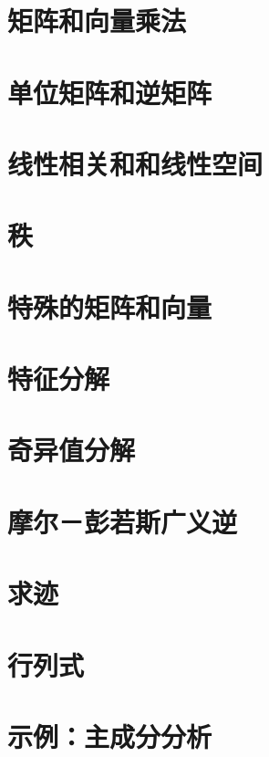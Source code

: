 \documentclass[a4paper,11pt]{book}
\begin{document}
\section{矩阵和向量乘法}
\label{sec:2.2}

\section{单位矩阵和逆矩阵}
\label{sec:2.3}

\section{线性相关和和线性空间}
\label{sec:2.4}

\section{秩}
\label{sec:2.5}

\section{特殊的矩阵和向量}
\label{sec:2.6}

\section{特征分解}
\label{sec:2.7}

\section{奇异值分解}
\label{sec:2.8}

\section{摩尔－彭若斯广义逆}
\label{sec:2.9}

\section{求迹}
\label{sec:2.10}

\section{行列式}
\label{sec:2.11}

\section{示例：主成分分析}
\label{sec:2.12}
\end{document}
